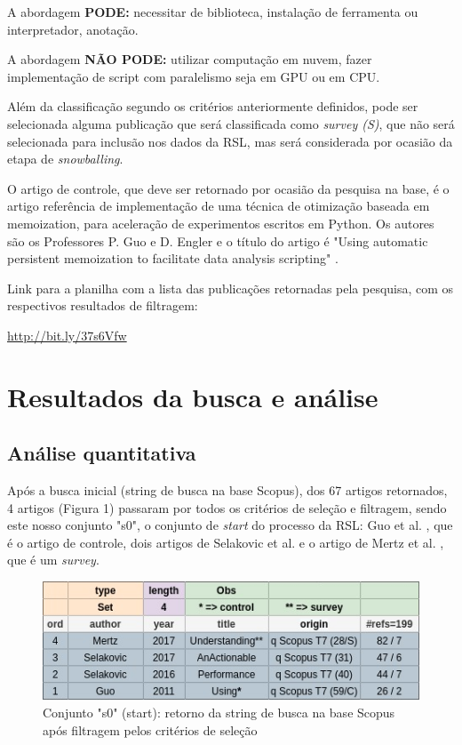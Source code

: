 \documentclass[sigconf]{acmart}
\begin{document}
A abordagem \textbf{PODE:} necessitar de biblioteca, instalação de ferramenta ou interpretador, anotação.

A abordagem \textbf{NÃO PODE:} utilizar computação em nuvem, fazer implementação de script com paralelismo seja em GPU ou em CPU.

Além da classificação segundo os critérios anteriormente definidos, pode ser selecionada alguma publicação que será classificada como \textit{survey (S)}, que não será selecionada para inclusão nos dados da RSL, mas será considerada por ocasião da etapa de \textit{snowballing}.

O artigo de controle, que deve ser retornado por ocasião da pesquisa na base, é o artigo referência de implementação de uma técnica de otimização baseada em memoization, para aceleração de experimentos escritos em Python. Os autores são os Professores P. Guo e D. Engler e o título do artigo é "Using automatic persistent memoization to facilitate data analysis scripting" \cite{guo2011using}.

Link para a planilha com a lista das publicações retornadas pela pesquisa, com os respectivos resultados de filtragem:

\url{http://bit.ly/37s6Vfw}


\section{Resultados da busca e análise}
\subsection{Análise quantitativa}
Após a busca inicial (string de busca na base Scopus), dos 67 artigos retornados, 4 artigos (Figura 1) passaram por todos os critérios de seleção e filtragem, sendo este nosso conjunto "s0", o conjunto de \textit{start} do processo da RSL: Guo et al. \cite{guo2011using}, que é o artigo de controle, dois artigos de Selakovic et al. \cite{selakovic2016performance}\cite{selakovic2017actionable} e o artigo de Mertz et al. \cite{mertz2017understanding}, que é um \textit{survey}.

\begin{figure}[H]
  \centering
  \includegraphics[width=\linewidth]{s0}
  \caption{Conjunto "s0" (start): retorno da string de busca na base Scopus após filtragem pelos critérios de seleção}
\end{figure}
\end{document}
